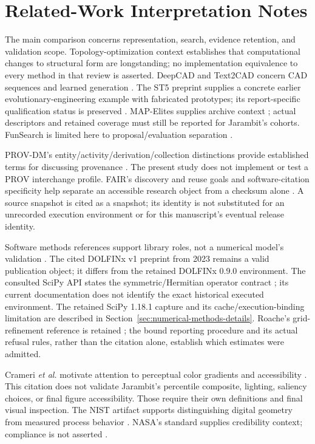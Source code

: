 \section{Related-Work Interpretation Notes}
\label{supp:related-work-notes}
The main comparison concerns representation, search, evidence retention, and validation scope. Topology-optimization context \cite{sigmundmaute} establishes that computational changes to structural form are longstanding; no implementation equivalence to every method in that review is asserted. DeepCAD and Text2CAD concern CAD sequences and learned generation \cite{deepcad,text2cad}. The ST5 preprint supplies a concrete earlier evolutionary-engineering example with fabricated prototypes; its report-specific qualification status is preserved \cite{st5}. MAP-Elites supplies archive context \cite{mapelites}; actual descriptors and retained coverage must still be reported for Jarambit's cohorts. FunSearch is limited here to proposal/evaluation separation \cite{funsearch}.

PROV-DM's entity/activity/derivation/collection distinctions provide established terms for discussing provenance \cite{provdm}. The present study does not implement or test a PROV interchange profile. FAIR's discovery and reuse goals and software-citation specificity help separate an accessible research object from a checksum alone \cite{fair,softwarecitation}. A source snapshot is cited as a snapshot; its identity is not substituted for an unrecorded execution environment or for this manuscript's eventual release identity.

Software methods references support library roles, not a numerical model's validation \cite{skfem,dolfinx}. The cited DOLFINx v1 preprint from 2023 remains a valid publication object; it differs from the retained DOLFINx 0.9.0 environment. The consulted SciPy API states the symmetric/Hermitian operator contract \cite{eigsh}; its current documentation does not identify the exact historical executed environment. The retained SciPy 1.18.1 capture and its cache/execution-binding limitation are described in Section~\ref{sec:numerical-methods-details}. Roache's grid-refinement reference is retained \cite{roache}; the bound reporting procedure and its actual refusal rules, rather than the citation alone, establish which estimates were admitted.

Crameri \emph{et al.} motivate attention to perceptual color gradients and accessibility \cite{crameri}. This citation does not validate Jarambit's percentile composite, lighting, saliency choices, or final figure accessibility. Those require their own definitions and final visual inspection. The NIST artifact supports distinguishing digital geometry from measured process behavior \cite{nistartifact}. NASA's standard supplies credibility context; compliance is not asserted \cite{nasa}.
